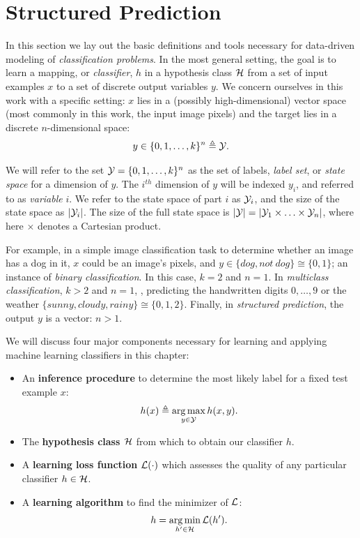 \chapter{Structured Prediction}\label{sec:ml}

In this section we lay out the basic definitions and tools necessary for 
data-driven modeling of {\em classification problems}.  In the most general 
setting, the goal is to learn a mapping, or {\em classifier}, $h$ in a 
hypothesis class $\mathcal{H}$ from a set of input examples $x$ to a set of discrete 
output variables $y$.   We concern ourselves in this work with a specific 
setting: $x$ lies in a (possibly high-dimensional) vector space (most commonly 
in this work, the input image pixels) and the target lies in a discrete 
$n$-dimensional space: $$y \in \{0,1,\ldots,k\}^n \triangleq \mathcal{Y}.$$  

We will refer to the set $\mathcal{Y} = \{0,1,\ldots,k\}^n$ as the set of labels, {\em 
label set}, or {\em state space} for a dimension of $y$.  The $i^{th}$ 
dimension of $y$ will be indexed $y_i$, and referred to as {\em variable} $i$.  
We refer to the state space of part $i$ as $\mathcal{Y}_i$, and the size of the state 
space as $|\mathcal{Y}_i|$.  The size of the full state space is $|\mathcal{Y}| = |\mathcal{Y}_1 \times 
\ldots \times \mathcal{Y}_n|$, where here $\times$ denotes a Cartesian product.

For example, in a simple image classification task to determine whether an 
image has a dog in it, $x$ could be an image's pixels, and $y \in \{dog, 
not~dog\} \cong \{0,1\} $; an instance of {\em binary classification}.  In this 
case, $k = 2$ and $n = 1$.  In {\em multiclass classification}, $k>2$ and $n = 
1$, \eg, predicting the handwritten digits $0,\dots,9$ or the weather $\{sunny, 
cloudy, rainy\} \cong \{0,1,2\}$.  Finally, in {\em structured prediction}, the 
output $y$ is a vector: $n > 1$.

We will discuss four major components necessary for learning and applying 
machine learning classifiers in this chapter:

\begin{itemize}
\item An {\bf inference procedure} to determine the most likely label for a 
fixed test example $x$: \begin{equation}
h(x) \triangleq \mathop{\arg\max}_{y \in \mathcal{Y}} h(x,y).
\end{equation}
\item The {\bf hypothesis class $\mathcal{H}$} from which to obtain our classifier $h$.
\item  A {\bf learning loss function} $\mathcal{L}(\cdot)$ which assesses the quality 
of any particular classifier $h \in \mathcal{H}$.
\item A {\bf learning algorithm} to find the minimizer of $\mathcal{L}$: 
\begin{equation}
h = \mathop{\arg\min}_{h' \in \mathcal{H}} \mathcal{L}(h').
\end{equation}
\end{itemize}

